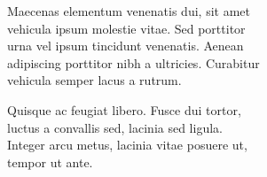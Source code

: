 \vspace*{7cm}
\begin{center}
Maecenas elementum venenatis dui, sit amet\\
vehicula ipsum molestie vitae. Sed porttitor\\
urna vel ipsum tincidunt venenatis. Aenean\\
adipiscing porttitor nibh a ultricies. Curabitur\\
vehicula semper lacus a rutrum.
\end{center}
\vspace{0.6cm}
\begin{center}
Quisque ac feugiat libero. Fusce dui tortor,\\
luctus a convallis sed, lacinia sed ligula.\\
Integer arcu metus, lacinia vitae posuere ut,\\
tempor ut ante.
\end{center}
